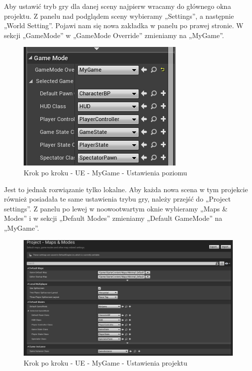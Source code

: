 \documentclass[openright]{xmgr}
\begin{document}
\newpage
Aby ustawić tryb gry dla danej sceny najpierw wracamy do głównego okna projektu. Z panelu nad podglądem sceny wybieramy „Settings”, a następnie „World Setting”. Pojawi nam się nowa zakładka w panelu po prawej stronie. W sekcji „GameMode” w „GameMode Override” zmieniamy na „MyGame”.

\begin{figure}[!htb]
    \begin{center}
    \includegraphics[scale=0.35]{Screeny/UeKrokPoKroku/UE-MyGame-WorldSetting.png}
    \end{center}
    \caption{Krok po kroku - UE -  MyGame - Ustawienia poziomu}
\end{figure}

Jest to jednak rozwiązanie tylko lokalne. Aby każda nowa scena w tym projekcie również posiadała te same ustawienia trybu gry, należy przejść do „Project settings”. Z panelu po lewej w noowootwartym oknie wybieramy „Maps \& Modes” i w sekcji „Default Modes” zmieniamy „Default GameMode” na „MyGame”.

\begin{figure}[!htb]
    \begin{center}
    \includegraphics[scale=0.35]{Screeny/UeKrokPoKroku/UE-MyGame-ProjectSettings.png}
    \end{center}
    \caption{Krok po kroku - UE -  MyGame - Ustawienia projektu}
\end{figure}
\end{document}
